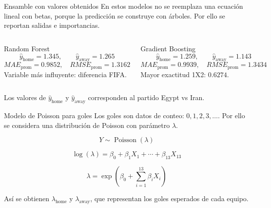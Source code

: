 \documentclass[aspectratio=169]{beamer}
\begin{document}
\begin{frame}[t]{Ensamble con valores obtenidos}
\scriptsize
\justifying
En estos modelos no se reemplaza una ecuación lineal con betas, porque la predicción se construye con árboles. Por ello se reportan salidas e importancias.

\vspace{0.15cm}
\begin{columns}[T]
\begin{block}{Random Forest}
\[
\hat{y}_{\text{home}}=1.345,\qquad
\hat{y}_{\text{away}}=1.265
\]
\[
MAE_{\text{prom}}=0.9852,\quad RMSE_{\text{prom}}=1.3162
\]
Variable más influyente: diferencia FIFA.
\end{block}

\begin{block}{Gradient Boosting}
\[
\hat{y}_{\text{home}}=1.259,\qquad
\hat{y}_{\text{away}}=1.143
\]
\[
MAE_{\text{prom}}=0.9939,\quad RMSE_{\text{prom}}=1.3434
\]
Mayor exactitud 1X2: $0.6274$.
\end{block}
\end{columns}

\vspace{0.15cm}
Los valores de $\hat{y}_{\text{home}}$ y $\hat{y}_{\text{away}}$ corresponden al partido Egypt vs Iran.
\end{frame}

\begin{frame}{Modelo de Poisson para goles}
\justifying
Los goles son datos de conteo: $0,1,2,3,\dots$. Por ello se considera una distribución de Poisson con parámetro $\lambda$.

\[
Y \sim \operatorname{Poisson}(\lambda)
\]

\[
\log(\lambda)=\beta_0+\beta_1X_1+\cdots+\beta_{13}X_{13}
\]

\[
\lambda=\exp\left(\beta_0+\sum_{i=1}^{13}\beta_iX_i\right)
\]

\vspace{0.1cm}
Así se obtienen $\lambda_{\text{home}}$ y $\lambda_{\text{away}}$, que representan los goles esperados de cada equipo.
\end{frame}
\end{document}
